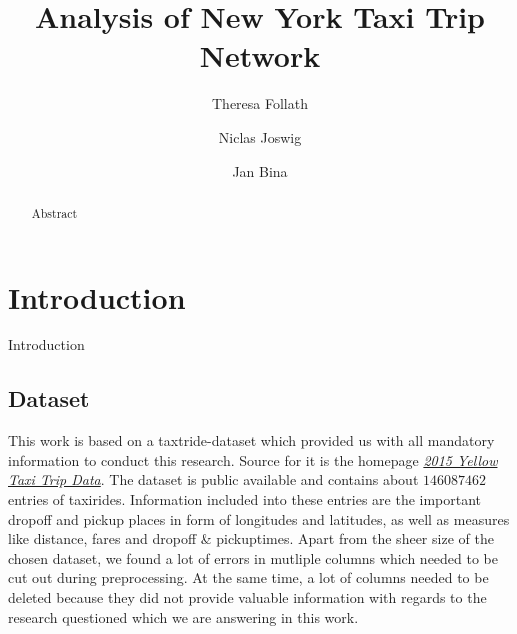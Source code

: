 \documentclass[sigconf]{acmart}
\begin{document}
\title{Analysis of New York Taxi Trip Network}
 
\author{Theresa Follath}

\author{Niclas Joswig}

\author{Jan Bina}


\begin{abstract}
Abstract
\end{abstract}


\maketitle

\chapter{Introduction}
Introduction

\section{Dataset}
This work is based on a taxtride-dataset which provided us with all mandatory information to conduct this research. Source for it is the homepage \emph{\href{https://data.cityofnewyork.us/view/ba8s-jw6u}{2015 Yellow Taxi Trip Data}}. The dataset is public available and contains about $146087462$ entries of taxirides. Information included into these entries are the important dropoff and pickup places in form of longitudes and latitudes, as well as measures like distance, fares and dropoff \& pickuptimes. 
Apart from the sheer size of the chosen dataset, we found a lot of errors in mutliple columns which needed to be cut out during preprocessing.
At the same time, a lot of columns needed to be deleted because they did not provide valuable information with regards to the research questioned which we are answering in this work.
\end{document}
